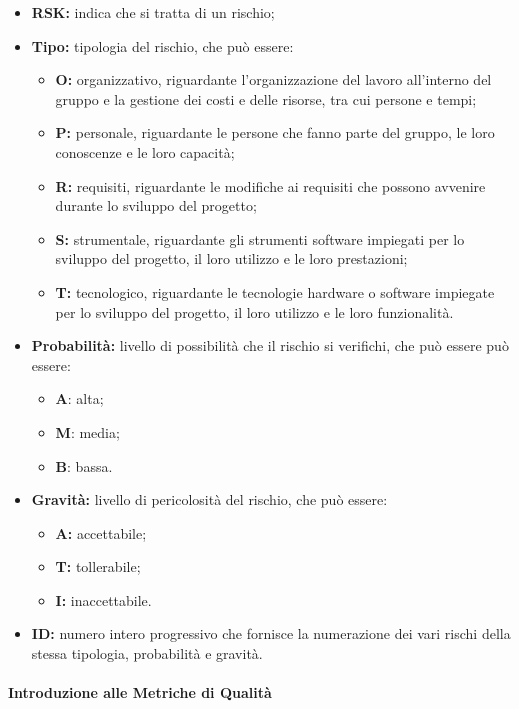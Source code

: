 			\begin{itemize}
				\item \textbf{RSK:} indica che si tratta di un rischio;
				\item \textbf{Tipo:} tipologia del rischio, che può essere:
				\begin{itemize}
					\item \textbf{O:} organizzativo, riguardante l'organizzazione del lavoro all'interno del gruppo e la gestione dei costi e delle risorse, tra cui persone e tempi;
					\item \textbf{P:} personale, riguardante le persone che fanno parte del gruppo, le loro conoscenze e le loro capacità;
					\item \textbf{R:} requisiti, riguardante le modifiche ai requisiti che possono avvenire durante lo sviluppo del progetto;
					\item \textbf{S:} strumentale, riguardante gli strumenti software impiegati per lo sviluppo del progetto, il loro utilizzo e le loro prestazioni;
					\item \textbf{T:} tecnologico, riguardante le tecnologie hardware o software impiegate per lo sviluppo del progetto, il loro utilizzo e le loro funzionalità.
				\end{itemize}
				\item \textbf{Probabilità:} livello di possibilità che il rischio si verifichi, che può essere può essere:
				\begin{itemize}
					\item \textbf{A}: alta;
					\item \textbf{M}: media;
					\item \textbf{B}: bassa.
				\end{itemize}
				\item \textbf{Gravità:} livello di pericolosità del rischio, che può essere:
				\begin{itemize}
					\item \textbf{A:} accettabile;
					\item \textbf{T:} tollerabile;
					\item \textbf{I:} inaccettabile.
				\end{itemize}
				\item \textbf{ID:} numero intero progressivo che fornisce la numerazione dei vari rischi della stessa tipologia, probabilità e gravità.

			\end{itemize}

			\paragraph{Introduzione alle Metriche di Qualità}

